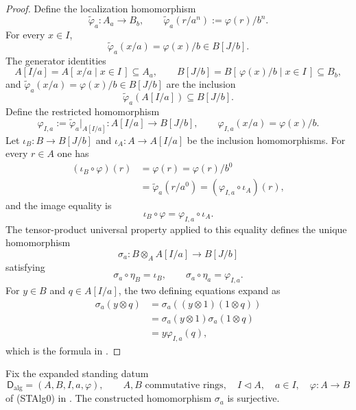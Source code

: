 \begin{proof}
  Define the localization homomorphism
  \[
    \widetilde\varphi_a\colon A_a\longrightarrow B_b,
    \qquad
    \widetilde\varphi_a(r/a^n):=\varphi(r)/b^n.
  \]
  For every $x\in I$,
  \[
    \widetilde\varphi_a(x/a)=\varphi(x)/b\in B[J/b].
  \]
  The generator identities
  \[
    A[I/a]=A[\,x/a\mid x\in I\,]\subseteq A_a,
    \qquad
    B[J/b]=B[\,\varphi(x)/b\mid x\in I\,]\subseteq B_b,
  \]
  and
  $\widetilde\varphi_a(x/a)=\varphi(x)/b\in B[J/b]$ are the inclusion
  \[
    \widetilde\varphi_a(A[I/a])\subseteq B[J/b].
  \]
  Define the restricted homomorphism
  \[
    \varphi_{I,a}
      :=\widetilde\varphi_a|_{A[I/a]}
      \colon A[I/a]\longrightarrow B[J/b],
    \qquad
    \varphi_{I,a}(x/a)=\varphi(x)/b.
  \]
  Let $\iota_B\colon B\to B[J/b]$ and
  $\iota_A\colon A\to A[I/a]$ be the inclusion homomorphisms.  For every
  $r\in A$ one has
  \[
  \begin{aligned}
    (\iota_B\circ\varphi)(r)
      &=\varphi(r)
       =\varphi(r)/b^0\\
      &=\widetilde\varphi_a(r/a^0)
       =(\varphi_{I,a}\circ\iota_A)(r),
  \end{aligned}
  \]
  and the image equality is
  \[
    \iota_B\circ\varphi=\varphi_{I,a}\circ\iota_A.
  \]
  The tensor-product universal property applied to this equality defines the
  unique homomorphism
  \[
    \sigma_a\colon B\otimes_AA[I/a]\longrightarrow B[J/b]
  \]
  satisfying
  \[
    \sigma_a\circ\eta_B=\iota_B,
    \qquad
    \sigma_a\circ\eta_a=\varphi_{I,a}.
  \]
  For $y\in B$ and $q\in A[I/a]$, the two defining equations expand as
  \[
  \begin{aligned}
    \sigma_a(y\otimes q)
      &=\sigma_a((y\otimes1)(1\otimes q))\\
      &=\sigma_a(y\otimes1)\sigma_a(1\otimes q)\\
      &=y\varphi_{I,a}(q),
  \end{aligned}
  \]
  which is the formula in
  .
\end{proof}

\begin{lemma}
  \label{lemma:nagata-strict-chart-map-surjective}

  Fix the expanded standing datum
  \[
    \mathsf D_{\mathrm{alg}}=(A,B,I,a,\varphi),\qquad
    A,B\text{ commutative rings},\quad
    I\triangleleft A,\quad a\in I,\quad
    \varphi\colon A\to B
  \]
  of (STAlg0) in
  .
  The constructed homomorphism $\sigma_a$ is surjective.
\end{lemma}

